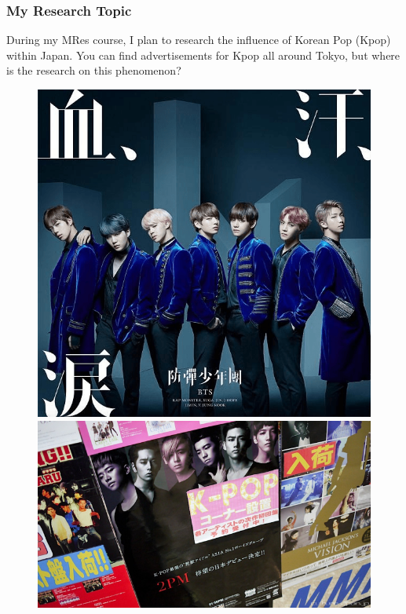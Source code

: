 \documentclass[aspectratio=169]{beamer}
\begin{document}
\begin{frame}
\frametitle{My Research Topic}
During my MRes course, I plan to research the influence of Korean Pop (Kpop) within Japan.
\newline
You can find advertisements for Kpop all around Tokyo, but where is the research on this phenomenon?
\newline
\begin{figure}[h]
\includegraphics[scale=0.2]{bts}
\includegraphics[scale=0.6]{kpopexample}
\end{figure}
\end{frame}
\end{document}
